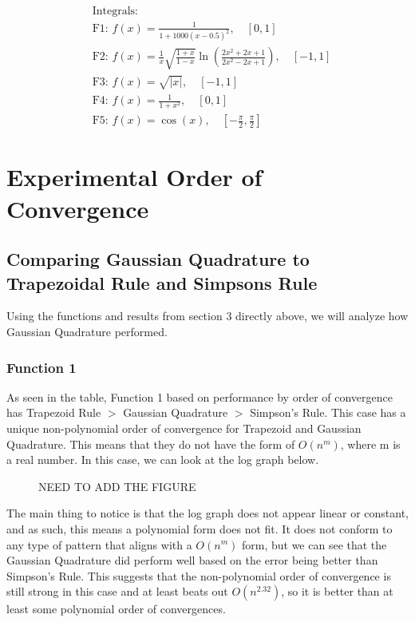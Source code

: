 \documentclass[12pt]{article}
\begin{document}
\begin{align*}
	 & \text{Integrals:}                                                                                                         \\
	 & \text{F1: }f(x) = \frac{1}{1 + 1000(x - 0.5)^2}, \quad [0, 1]                                                             \\
	 & \text{F2: }f(x) = \frac{1}{x}\sqrt{\frac{1 + x}{1 - x}}\ln\left(\frac{2x^2 + 2x + 1}{2x^2 - 2x + 1}\right), \quad [-1, 1] \\
	 & \text{F3: }f(x) = \sqrt{|x|}, \quad [-1, 1]                                                                               \\
	 & \text{F4: }f(x) = \frac{1}{1 + x^2}, \quad [0, 1]                                                                         \\
	 & \text{F5: }f(x) = \cos(x), \quad [-\frac{\pi}{2}, \frac{\pi}{2}]
\end{align*}

\section{Experimental Order of Convergence}

\subsection*{Comparing Gaussian Quadrature to Trapezoidal Rule and Simpsons Rule}
Using the functions and results from section 3 directly above,  we will analyze how Gaussian Quadrature performed.

\subsubsection{Function 1}

As seen in the table, Function 1 based on performance by order of convergence has Trapezoid Rule $>$ Gaussian Quadrature $>$ Simpson's Rule. This case has a unique non-polynomial order of convergence for Trapezoid and Gaussian Quadrature. This means that they do not have the form of $O(n^m)$, where m is a real number. In this case, we can look at the log graph below. 

\begin{figure}
    NEED TO ADD THE FIGURE
\end{figure}

The main thing to notice is that the log graph does not appear linear or constant, and as such, this means a polynomial form does not fit. It does not conform to any type of pattern that aligns with a $O(n^m)$ form, but we can see that the Gaussian Quadrature did perform well based on the error being better than Simpson's Rule. This suggests that the non-polynomial order of convergence is still strong in this case and at least beats out $O(n^{2.32})$, so it is better than at least some polynomial order of convergences.
\end{document}
